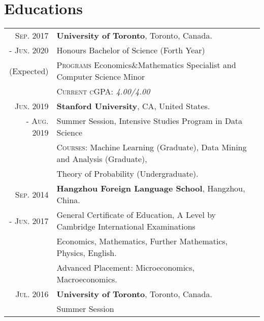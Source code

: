 \documentclass[a4paper,10pt]{article}
\begin{document}
\section{Educations}
\begin{tabular}{rl}

    \textsc{Sep.} 2017 & \textbf{University of Toronto}, Toronto, Canada. \\
    - \textsc{Jun.} 2020 & {Honours Bachelor of Science} (Forth Year) \\
    (Expected)& \quad \textsc{Programs} Economics\&Mathematics Specialist and Computer Science Minor \\
    & \quad \textsc{Current cGPA: } \emph{4.00/4.00}\\
    \textsc{Jun.} 2019 & \textbf{Stanford University}, CA, United States. \\
    - \textsc{Aug.} 2019 & Summer Session, Intensive Studies Program in Data Science\\
    	& \quad \textsc{Courses:} Machine Learning (Graduate), Data Mining and Analysis (Graduate), \\
    	& \quad Theory of Probability (Undergraduate).\\
    \textsc{Sep.} 2014 & \textbf{Hangzhou Foreign Language School}, Hangzhou, China.\\
    - \textsc{Jun.} 2017 & {General Certificate of Education, A Level by Cambridge International Examinations} \\
    & \quad Economics, Mathematics, Further Mathematics, Physics, English. \\
    & {Advanced Placement}: Microeconomics, Macroeconomics. \\
    \textsc{Jul.} 2016 & \textbf{University of Toronto}, Toronto, Canada. \\
    & Summer Session

\end{tabular}
\end{document}
